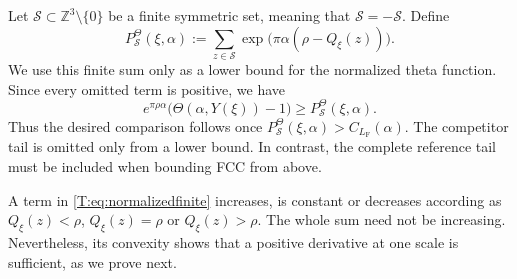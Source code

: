 \documentclass[reqno,english]{amsart}
\theoremstyle{definition}
\newtheorem{open problem}[theorem]{Open Problem}
\theoremstyle{remark}
\theoremstyle{plain}
\numberwithin{equation}{section}
\newcommand{\Z}{\mathbb Z}
\newcommand{\FCC}{L_{\mathrm F}}
\newcommand{\Th}{\Theta}
\begin{document}
Let $\mathcal S\subset\Z^3\setminus\{0\}$ be a finite symmetric set,
meaning that $\mathcal S=-\mathcal S$. Define
\begin{equation}\label{T:eq:normalizedfinite}
 P^{\Theta}_{\mathcal S}(\xi,\alpha)
 :=\sum_{z\in\mathcal S}
       \exp\bigl(\pi\alpha(\rho-Q_\xi(z))\bigr).
\end{equation}
We use this finite sum only as a lower bound for the normalized theta
function. Since every omitted term is positive, we have
\begin{equation}\label{T:eq:finitebelow}
 e^{\pi\rho\alpha}\bigl(\Th(\alpha,Y(\xi))-1\bigr)
 \ge P^{\Theta}_{\mathcal S}(\xi,\alpha).
\end{equation}
Thus the desired comparison follows once
$P^{\Theta}_{\mathcal S}(\xi,\alpha)>C_{\FCC}(\alpha)$.
The competitor tail is omitted only from a lower bound. In contrast,
the complete reference tail must be included when bounding FCC from
above.

A term in \eqref{T:eq:normalizedfinite} increases, is constant or
decreases according as $Q_\xi(z)<\rho$, $Q_\xi(z)=\rho$ or
$Q_\xi(z)>\rho$. The whole sum need not be increasing. Nevertheless,
its convexity shows that a positive derivative at one scale is
sufficient, as we prove next.
\end{document}
